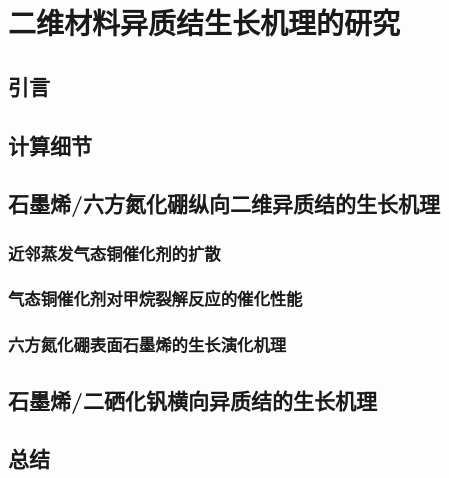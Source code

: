 \chapter{二维材料异质结生长机理的研究}
\section{引言}
\section{计算细节}
\section{石墨烯/六方氮化硼纵向二维异质结的生长机理}
    \subsection{近邻蒸发气态铜催化剂的扩散}
    \subsection{气态铜催化剂对甲烷裂解反应的催化性能}
    \subsection{六方氮化硼表面石墨烯的生长演化机理}
\section{石墨烯/二硒化钒横向异质结的生长机理}
\section{总结}